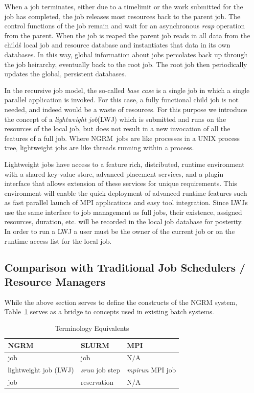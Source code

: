 \documentclass{article}
\newcommand{\ngrm}{NGRM}
\begin{document}
When a job terminates, either due to a timelimit or the work
submitted for the job has completed, the job releases most resources
back to the parent job. The control functions of the job remain and
wait for an asynchronous {\em reap} operation from the parent. When
the job is reaped the parent job reads in all data from the child\'s
local job and resource database and instantiates that data in
its own databases. In this way, global information about jobs
percolates back up through the job heirarchy, eventually back to
the root job.  The root job then periodically updates the global,
persistent databases.

In the recursive job model, the so-called {\em base case} is a
single job in which a single parallel application is invoked. For
this case, a fully functional child job is not needed, and indeed
would be a waste of resources. For this purpose we introduce the
concept of a {\em lightweight job}(LWJ) which is submitted and
runs on the resources of the local job, but does not result in
a new invocation of all the features of a full job. Where
\ngrm\ jobs are like processes in a UNIX process tree, lightweight jobs
are like threads running within a process.

Lightweight jobs have access to a feature rich, distributed,
runtime environment with a shared key-value store, advanced
placement services, and a plugin interface that allows extension
of these services for unique requirements. This environment will
enable the quick deployment of advanced runtime features such as
fast parallel launch of MPI applications and easy tool integration.
Since LWJs use the same interface to job management as full
jobs, their existence, assigned resources, duration, etc.
will be recorded in the local job database for posterity.
In order to run a LWJ a user must be the owner of the current
job or on the runtime access list for the local job.

\subsection{Comparison with Traditional Job Schedulers / Resource Managers}

While the above section serves to define the constructs of the NGRM
system, Table~\ref{tab:tradterms} serves as a bridge to concepts used
in existing batch systems.

\begin{table}
\caption{Terminology Equivalents}
\centering
\begin{tabular}{|l|l|l|}
\hline
NGRM & SLURM & MPI \\
\hline
job & job & N/A\\
lightweight job (LWJ) & {\em srun} job step & {\em mpirun} MPI job\\
job & reservation & N/A \\
\hline
\end{tabular}
\label{tab:tradterms}
\end{table}
\end{document}
